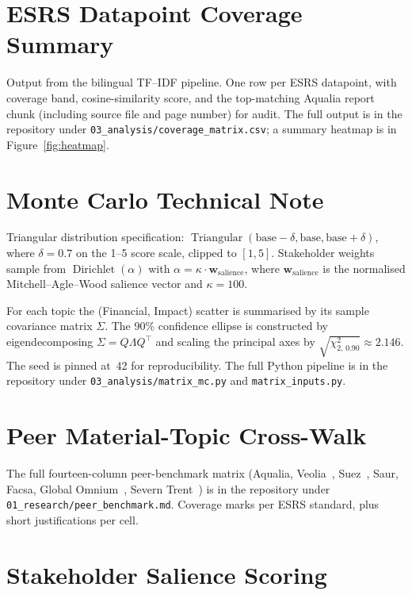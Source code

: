 \documentclass[11pt, a4paper, twoside, openright]{scrreprt}
\begin{document}
\chapter{ESRS Datapoint Coverage Summary}
\label{app:esrs}

Output from the bilingual TF--IDF pipeline. One row per ESRS datapoint, with coverage band, cosine-similarity score, and the top-matching Aqualia report chunk (including source file and page number) for audit. The full output is in the repository under \texttt{03\_analysis/coverage\_matrix.csv}; a summary heatmap is in Figure~\ref{fig:heatmap}.

\chapter{Monte Carlo Technical Note}
\label{app:mc}

Triangular distribution specification: $\operatorname{Triangular}(\text{base} - \delta, \text{base}, \text{base} + \delta)$, where $\delta = 0.7$ on the 1--5 score scale, clipped to $[1,5]$. Stakeholder weights sample from $\operatorname{Dirichlet}(\alpha)$ with $\alpha = \kappa \cdot \mathbf{w}_{\text{salience}}$, where $\mathbf{w}_{\text{salience}}$ is the normalised Mitchell--Agle--Wood salience vector and $\kappa = 100$.

For each topic the (Financial, Impact) scatter is summarised by its sample covariance matrix $\Sigma$. The 90\% confidence ellipse is constructed by eigendecomposing $\Sigma = Q \Lambda Q^\top$ and scaling the principal axes by $\sqrt{\chi^2_{2,\,0.90}} \approx 2.146$. The seed is pinned at~42 for reproducibility. The full Python pipeline is in the repository under \texttt{03\_analysis/matrix\_mc.py} and \texttt{matrix\_inputs.py}.

\chapter{Peer Material-Topic Cross-Walk}
\label{app:peers}

The full fourteen-column peer-benchmark matrix (Aqualia, Veolia~\cite{veolia2024}, Suez~\cite{suez2024}, Saur, Facsa, Global Omnium~\cite{globalomnium2023}, Severn Trent~\cite{severntrent2024}) is in the repository under \texttt{01\_research/peer\_benchmark.md}. Coverage marks per ESRS standard, plus short justifications per cell.

\chapter{Stakeholder Salience Scoring}
\label{app:salience}
\end{document}
